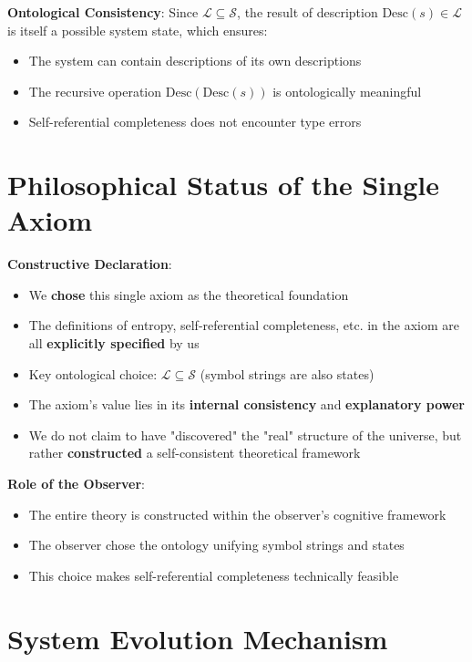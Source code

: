 \textbf{Ontological Consistency}: Since $\mathcal{L} \subseteq \mathcal{S}$, the result of description $\text{Desc}(s) \in \mathcal{L}$ is itself a possible system state, which ensures:
\begin{itemize}
\item The system can contain descriptions of its own descriptions
\item The recursive operation $\text{Desc}(\text{Desc}(s))$ is ontologically meaningful
\item Self-referential completeness does not encounter type errors
\end{itemize}

\section{Philosophical Status of the Single Axiom}
\label{sec:ch01_axiom_and_derivation:philosophical-status-of-the-single-axiom}

\textbf{Constructive Declaration}:
\begin{itemize}
\item We \textbf{chose} this single axiom as the theoretical foundation
\item The definitions of entropy, self-referential completeness, etc. in the axiom are all \textbf{explicitly specified} by us
\item Key ontological choice: $\mathcal{L} \subseteq \mathcal{S}$ (symbol strings are also states)
\item The axiom's value lies in its \textbf{internal consistency} and \textbf{explanatory power}
\item We do not claim to have "discovered" the "real" structure of the universe, but rather \textbf{constructed} a self-consistent theoretical framework
\end{itemize}

\textbf{Role of the Observer}:
\begin{itemize}
\item The entire theory is constructed within the observer's cognitive framework
\item The observer chose the ontology unifying symbol strings and states
\item This choice makes self-referential completeness technically feasible
\end{itemize}

\section{System Evolution Mechanism}
\label{sec:ch01_axiom_and_derivation:system-evolution-mechanism-clarification-of-time-evolution-in-the-axiom}

